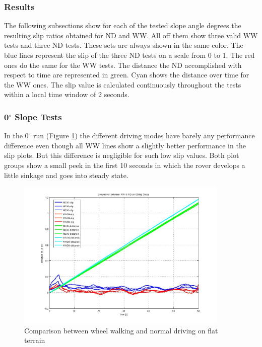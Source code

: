 \documentclass[a4paper,twocolumn]{esapub2005} %
\begin{document}
\subsubsection{Results} 
The following subsections show for each of the tested slope angle degrees the resulting slip ratios obtained for ND and WW. All off them show three valid WW tests and three ND tests. These sets are always shown in the same color. The blue lines represent the slip of the three ND tests on a scale from 0 to 1. The red ones do the same for the WW tests. The distance the ND accomplished with respect to 
time are represented in green. Cyan shows the distance over time for the WW ones. The slip value is calculated continuously throughout the tests within a local time window of 2 seconds.

\subsubsection*{0$^{\circ}$ Slope Tests}
In the 0$^\circ$ run (Figure \ref{fig:00d}) the different driving modes have
barely any performance difference even though all WW lines show a slightly
better performance in the slip plots. But this difference is negligible for
such low slip values. Both plot groups show a small peek in the first 10
seconds in which the rover develops a little sinkage and goes into steady
state. 

\begin{figure}[h!]
    \centering
    \includegraphics[width=0.9\textwidth]{00d.jpg}
    \caption{Comparison between wheel walking and normal driving on flat terrain}
    \label{fig:00d}
\end{figure}
\end{document}
